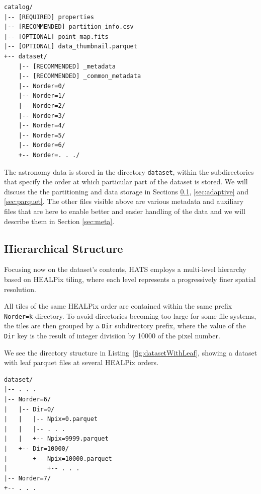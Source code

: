 \documentclass[11pt,a4paper]{ivoa}
\begin{document}
\begin{minipage}{\linewidth}
\begin{lstlisting}[caption=Example catalog directory contents, label=fig:exampleCatalogStructure]
catalog/
|-- [REQUIRED] properties
|-- [RECOMMENDED] partition_info.csv
|-- [OPTIONAL] point_map.fits
|-- [OPTIONAL] data_thumbnail.parquet
+-- dataset/
    |-- [RECOMMENDED] _metadata
    |-- [RECOMMENDED] _common_metadata
    |-- Norder=0/
    |-- Norder=1/
    |-- Norder=2/
    |-- Norder=3/
    |-- Norder=4/
    |-- Norder=5/
    |-- Norder=6/
    +-- Norder=. . ./
\end{lstlisting}
\end{minipage}

The astronomy data is stored in the directory \texttt{dataset}, within the subdirectories that specify the order at which particular part of the dataset is stored. We will discuss the the partitioning and data storage in Sections \ref{sec:hierarchical}, \ref{sec:adaptive} and \ref{sec:parquet}. The other files visible above are various metadata and auxiliary files that are here to enable better and easier handling of the data and we will describe them in Section \ref{sec:meta}. 
    
\subsection{Hierarchical Structure} \label{sec:hierarchical}
Focusing now on the dataset's contents, HATS employs a multi-level hierarchy based on HEALPix tiling, where each level represents a progressively finer spatial resolution.

All tiles of the same HEALPix order are contained within the same prefix \texttt{Norder=k} directory. 
To avoid directories becoming too large for some file systems, the tiles are then grouped by a \texttt{Dir} subdirectory prefix,
where the value of the \texttt{Dir} key is the result of integer divisiion by 10000 of the pixel number.

We see the directory structure in Listing~\ref{fig:datasetWithLeaf}, showing a dataset with leaf parquet files at several HEALPix orders.

\begin{minipage}{\linewidth}
\begin{lstlisting}[caption=Example catalog dataset directory contents, label=fig:datasetWithLeaf]
dataset/
|-- . . .
|-- Norder=6/
|   |-- Dir=0/
|   |   |-- Npix=0.parquet
|   |   |-- . . .
|   |   +-- Npix=9999.parquet
|   +-- Dir=10000/
|       +-- Npix=10000.parquet
|           +-- . . .
|-- Norder=7/
+-- . . .
\end{lstlisting} 
\end{minipage}
\end{document}
